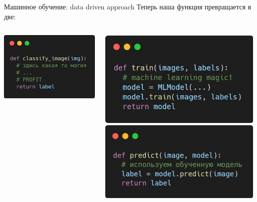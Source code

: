 \documentclass[aspectratio=169, professionalfonts]{beamer}
\begin{document}
\begin{frame}{Машинное обучение: data driven approach}
    \centering
    Теперь наша функция превращается в две:
    \begin{columns}[T]
        \begin{column}{.4\linewidth}
            \centering
            \includegraphics[width=\linewidth]{figures/fig9-clf-function.jpg}
        \end{column}
        \begin{column}{.6\linewidth}
            \centering
            \includegraphics[width=.64\linewidth]{figures/fig38-train-func.jpg}
            \includegraphics[width=.64\linewidth]{figures/fig39-predict-func.jpg}
        \end{column}
    \end{columns}
\end{frame}
\end{document}
